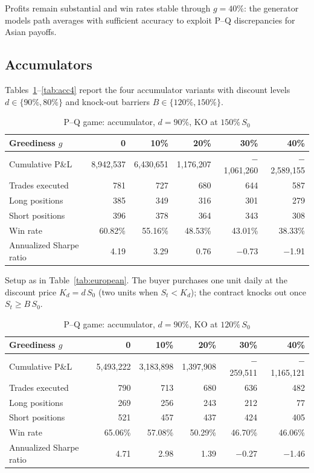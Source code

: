 \documentclass[12pt,letterpaper]{article}
\newcommand{\tabnote}[1]{\begin{minipage}{\linewidth}\vspace{4pt}\footnotesize\singlespacing #1\end{minipage}}
\begin{document}
Profits remain substantial and win rates stable through $g = 40\%$: the
generator models path averages with sufficient accuracy to exploit P--Q
discrepancies for Asian payoffs.

\subsection{Accumulators}

Tables~\ref{tab:acc1}--\ref{tab:acc4} report the four accumulator variants
with discount levels $d \in \{90\%, 80\%\}$ and knock-out barriers
$B \in \{120\%, 150\%\}$.

\begin{table}[ht]
\singlespacing
\centering
\caption{P--Q game: accumulator, $d = 90\%$, KO at $150\%\,S_0$}
\label{tab:acc1}
\begin{tabular}{lrrrrr}
\toprule
Greediness $g$ & 0 & 10\% & 20\% & 30\% & 40\% \\
\midrule
Cumulative P\&L & 8{,}942{,}537 & 6{,}430{,}651 & 1{,}176{,}207 & $-$1{,}061{,}260 & $-$2{,}589{,}155 \\
Trades executed & 781 & 727 & 680 & 644 & 587 \\
Long positions  & 385 & 349 & 316 & 301 & 279 \\
Short positions & 396 & 378 & 364 & 343 & 308 \\
Win rate & 60.82\% & 55.16\% & 48.53\% & 43.01\% & 38.33\% \\
Annualized Sharpe ratio & 4.19 & 3.29 & 0.76 & $-$0.73 & $-$1.91 \\
\bottomrule
\end{tabular}
\tabnote{Setup as in Table~\ref{tab:european}. The buyer purchases one unit
daily at the discount price $K_d = d\,S_0$ (two units when $S_t < K_d$);
the contract knocks out once $S_t \ge B\,S_0$.}
\end{table}

\begin{table}[ht]
\singlespacing
\centering
\caption{P--Q game: accumulator, $d = 90\%$, KO at $120\%\,S_0$}
\label{tab:acc2}
\begin{tabular}{lrrrrr}
\toprule
Greediness $g$ & 0 & 10\% & 20\% & 30\% & 40\% \\
\midrule
Cumulative P\&L & 5{,}493{,}222 & 3{,}183{,}898 & 1{,}397{,}908 & $-$259{,}511 & $-$1{,}165{,}121 \\
Trades executed & 790 & 713 & 680 & 636 & 482 \\
Long positions  & 269 & 256 & 243 & 212 & 77 \\
Short positions & 521 & 457 & 437 & 424 & 405 \\
Win rate & 65.06\% & 57.08\% & 50.29\% & 46.70\% & 46.06\% \\
Annualized Sharpe ratio & 4.71 & 2.98 & 1.39 & $-$0.27 & $-$1.46 \\
\bottomrule
\end{tabular}
\end{table}
\end{document}
